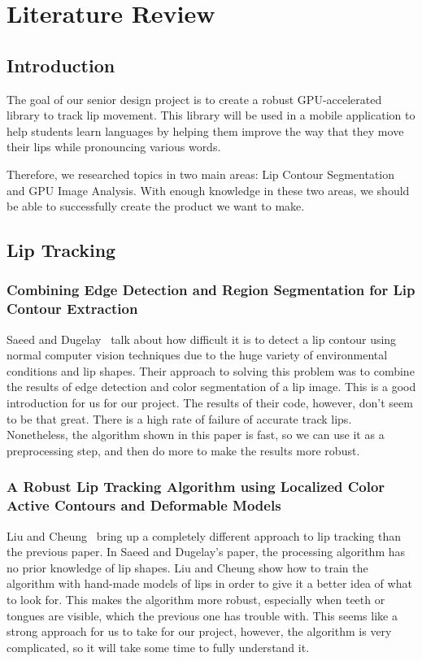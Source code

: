 \chapter{Literature Review}

\section{Introduction}

The goal of our senior design project is to create a robust GPU-accelerated library to track lip movement. This library will be used in a mobile application to help students learn languages by helping them improve the way that they move their lips while pronouncing various words. 

Therefore, we researched topics in two main areas: Lip Contour Segmentation and GPU Image Analysis. With enough knowledge in these two areas, we should be able to successfully create the product we want to make.

\section{Lip Tracking}

	\subsection{Combining Edge Detection and Region Segmentation for Lip Contour Extraction}
	
	Saeed and Dugelay~ talk about how difficult it is to detect a lip contour using normal computer vision techniques due to the huge variety of environmental conditions and lip shapes. Their approach to solving this problem was to combine the results of edge detection and color segmentation of a lip image. This is a good introduction for us for our project. The results of their code, however, don't seem to be that great. There is a high rate of failure of accurate track lips. Nonetheless, the algorithm shown in this paper is fast, so we can use it as a preprocessing step, and then do more to make the results more robust.
	
	\subsection{A Robust Lip Tracking Algorithm using Localized Color Active Contours and Deformable Models}
	
	Liu and Cheung~ bring up a completely different approach to lip tracking than the previous paper. In Saeed and Dugelay's paper, the processing algorithm has no prior knowledge of lip shapes. Liu and Cheung show how to train the algorithm with hand-made models of lips in order to give it a better idea of what to look for. This makes the algorithm more robust, especially when teeth or tongues are visible, which the previous one has trouble with. This seems like a strong approach for us to take for our project, however, the algorithm is very complicated, so it will take some time to fully understand it.
	
